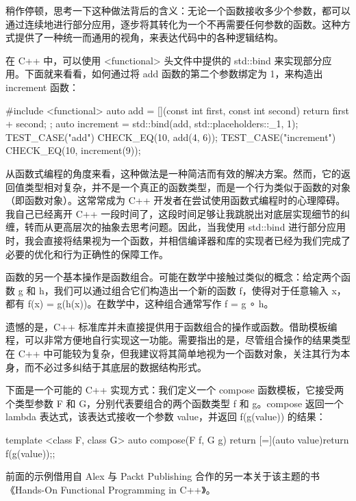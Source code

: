 稍作停顿，思考一下这种做法背后的含义：无论一个函数接收多少个参数，都可以通过连续地进行部分应用，逐步将其转化为一个不再需要任何参数的函数。这种方式提供了一种统一而通用的视角，来表达代码中的各种逻辑结构。

在 C++ 中，可以使用 <functional> 头文件中提供的 std::bind 来实现部分应用。下面就来看看，如何通过将 add 函数的第二个参数绑定为 1，来构造出 increment 函数：

\begin{cpp}
#include <functional>
auto add = [](const int first, const int second){ return first +
second; };
auto increment = std::bind(add, std::placeholders::_1, 1);
TEST_CASE("add"){
  CHECK_EQ(10, add(4, 6));
}
TEST_CASE("increment"){
  CHECK_EQ(10, increment(9));
}
\end{cpp}

从函数式编程的角度来看，这种做法是一种简洁而有效的解决方案。然而，它的返回值类型相对复杂，并不是一个真正的函数类型，而是一个行为类似于函数的对象（即函数对象）。这常常成为 C++ 开发者在尝试使用函数式编程时的心理障碍。我自己已经离开 C++ 一段时间了，这段时间足够让我跳脱出对底层实现细节的纠缠，转而从更高层次的抽象去思考问题。因此，当我使用 std::bind 进行部分应用时，我会直接将结果视为一个函数，并相信编译器和库的实现者已经为我们完成了必要的优化和行为正确性的保障工作。

函数的另一个基本操作是函数组合。可能在数学中接触过类似的概念：给定两个函数 g 和 h，我们可以通过组合它们构造出一个新的函数 f，使得对于任意输入 x，都有 f(x) = g(h(x))。在数学中，这种组合通常写作 f = g ∘ h。

遗憾的是，C++ 标准库并未直接提供用于函数组合的操作或函数。借助模板编程，可以非常方便地自行实现这一功能。需要指出的是，尽管组合操作的结果类型在 C++ 中可能较为复杂，但我建议将其简单地视为一个函数对象，关注其行为本身，而不必过多纠结于其底层的数据结构形式。

下面是一个可能的 C++ 实现方式：我们定义一个 compose 函数模板，它接受两个类型参数 F 和 G，分别代表要组合的两个函数类型 f 和 g。compose 返回一个 lambda 表达式，该表达式接收一个参数 value，并返回 f(g(value)) 的结果：

\begin{cpp}
template <class F, class G>
auto compose(F f, G g){
return [=](auto value){return f(g(value));};
}
\end{cpp}

\begin{myTip}{}
前面的示例借用自 Alex 与 Packt Publishing 合作的另一本关于该主题的书 《Hands-On Functional Programming in C++》。
\end{myTip}

